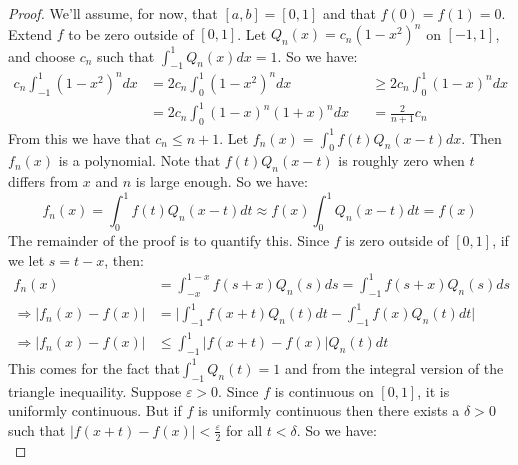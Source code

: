 \documentclass[crop=false,class=article,oneside]{standalone}
\begin{document}
            \begin{proof}
                We'll assume, for now, that $[a,b]=[0,1]$
                and that $f(0)=f(1)=0$. Extend $f$ to be
                zero outside of $[0,1]$. Let
                $Q_{n}(x)=c_{n}(1-x^{2})^{n}$ on $[-1,1]$,
                and choose $c_{n}$ such that
                $\int_{-1}^{1}Q_{n}(x)dx=1$. So we have:
                \begin{align*}
                    c_{n}\int_{-1}^{1}(1-x^{2})^{n}dx
                    &=2c_{n}\int_{0}^{1}(1-x^{2})^{n}dx
                    &
                    &\geq{2c_{n}}\int_{0}^{1}(1-x)^{n}dx\\
                    &=2c_{n}\int_{0}^{1}(1-x)^{n}(1+x)^{n}dx
                    &
                    &=\frac{2}{n+1}c_{n}
                \end{align*}
            From this we have that $c_{n}\leq{n+1}$. Let
            $f_{n}(x)=\int_{0}^{1}f(t)Q_{n}(x-t)dx$.
            Then $f_{n}(x)$ is a polynomial. Note that
            $f(t)Q_{n}(x-t)$ is roughly zero when $t$ differs
            from $x$ and $n$ is large enough. So we have:
            \begin{equation*}
                f_{n}(x)=\int_{0}^{1}f(t)Q_{n}(x-t)dt
                \approx{f(x)}\int_{0}^{1}Q_{n}(x-t)dt=f(x)
            \end{equation*}
            The remainder of the proof is to quantify this.
            Since $f$ is zero outside of $[0,1]$, if
            we let $s=t-x$, then:
            \begin{align*}
                f_{n}(x)&=\int_{-x}^{1-x}f(s+x)Q_{n}(s)ds
                =\int_{-1}^{1}f(s+x)Q_{n}(s)ds\\
                \Rightarrow|f_{n}(x)-f(x)|
                &=\bigg|\int_{-1}^{1}f(x+t)Q_{n}(t)dt
                -\int_{-1}^{1}f(x)Q_{n}(t)dt\bigg|\\
                \Rightarrow|f_{n}(x)-f(x)|
                &\leq\int_{-1}^{1}|f(x+t)-f(x)|Q_{n}(t)dt
            \end{align*}
            This comes for the fact that$\int_{-1}^{1}Q_{n}(t)=1$
            and from the integral version of the triangle
            inequaility.
            Suppose $\varepsilon>0$. Since $f$ is continuous
            on $[0,1]$, it is uniformly continuous. But
            if $f$ is uniformly continuous then there exists
            a $\delta>0$ such that
            $|f(x+t)-f(x)|<\frac{\varepsilon}{2}$ for all
            $t<\delta$. So we have:
            \begin{equation*}

\end{equation*}
\end{proof}
\end{document}
